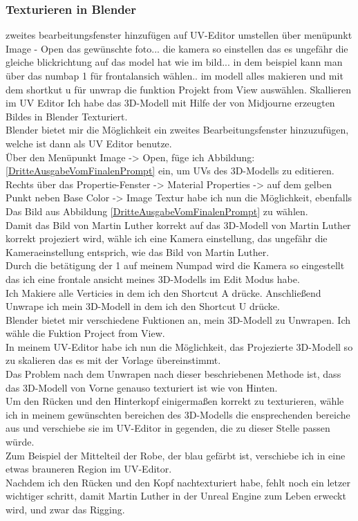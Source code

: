 \documentclass[10pt,a4paper,bibliography=totocnumbered,listof=totocnumbered]{scrartcl}
\begin{document}
\subsubsection{Texturieren in Blender}
zweites bearbeitungsfenster hinzufügen auf UV-Editor umstellen über menüpunkt Image - Open das gewünschte foto... die kamera so einstellen das es ungefähr die gleiche blickrichtung auf das model hat wie im bild... in dem beispiel kann man über das numbap 1 für frontalansich wählen..
im modell alles makieren und mit dem shortkut u für unwrap die funktion Projekt from View auswählen.
Skallieren im UV Editor
Ich habe das 3D-Modell mit Hilfe der von Midjourne erzeugten Bildes in Blender Texturiert.
\\
Blender bietet mir die Möglichkeit ein zweites Bearbeitungsfenster hinzuzufügen, welche ist dann als UV Editor benutze.
\\
Über den Menüpunkt Image -> Open, füge ich Abbildung: \ref{DritteAusgabeVomFinalenPrompt} ein, um UVs des 3D-Modells zu editieren.
\\
Rechts über das Propertie-Fenster -> Material Properties -> auf dem gelben Punkt neben Base Color -> Image Textur habe ich nun die Möglichkeit, ebenfalls Das Bild aus Abbildung \ref{DritteAusgabeVomFinalenPrompt} zu wählen.
\\
Damit das Bild von Martin Luther korrekt auf das 3D-Modell von Martin Luther korrekt projeziert wird, wähle ich eine Kamera einstellung, das ungefähr die Kameraeinstellung entsprich, wie das Bild von Martin Luther.
\\
Durch die betätigung der 1 auf meinem Numpad wird die Kamera so eingestellt das ich eine frontale ansicht meines 3D-Modells im Edit Modus habe.
\\
Ich Makiere alle Verticies in dem ich den Shortcut A drücke. Anschließend Unwrape ich mein 3D-Modell in dem ich den Shortcut U drücke.
\\
Blender bietet mir verschiedene Fuktionen an, mein 3D-Modell zu Unwrapen. Ich wähle die Fuktion Project from View.
\\
In meinem UV-Editor habe ich nun die Möglichkeit, das Projezierte 3D-Modell so zu skalieren das es mit der Vorlage übereinstimmt.
\\
Das Problem nach dem Unwrapen nach dieser beschriebenen Methode ist, dass das 3D-Modell von Vorne genauso texturiert ist wie von Hinten.
\\
Um den Rücken und den Hinterkopf einigermaßen korrekt zu texturieren, wähle ich in meinem gewünschten bereichen des 3D-Modells die ensprechenden bereiche aus und verschiebe sie im UV-Editor in gegenden, die zu dieser Stelle passen würde.
\\
Zum Beispiel der Mittelteil der Robe, der blau gefärbt ist, verschiebe ich in eine etwas brauneren Region im UV-Editor.
\\
Nachdem ich den Rücken und den Kopf nachtexturiert habe, fehlt noch ein letzer wichtiger schritt, damit Martin Luther in der Unreal Engine zum Leben erweckt wird, und zwar das Rigging.
\end{document}
